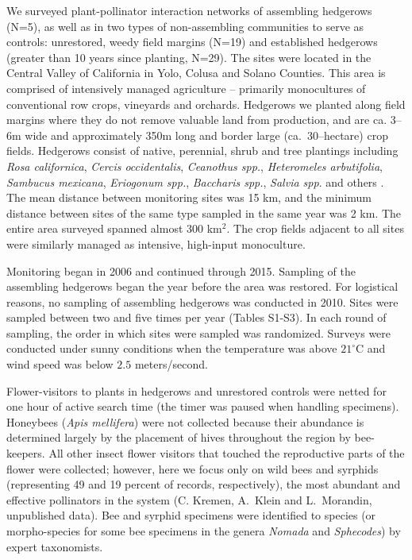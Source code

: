 \documentclass[12pt]{article}
\begin{document}
We surveyed plant-pollinator interaction networks of assembling
hedgerows (N=5), as well as in two types of non-assembling communities
to serve as controls: unrestored, weedy field margins (N=19) and
established hedgerows (greater than 10 years since planting,
N=29). The sites were located in the Central Valley of California in
Yolo, Colusa and Solano Counties. This area is comprised of
intensively managed agriculture -- primarily monocultures of
conventional row crops, vineyards and orchards. Hedgerows we planted
along field margins where they do not remove valuable land from
production, and are ca. 3--6m wide and approximately 350m long and
border large (ca.\ 30--hectare) crop fields. Hedgerows consist of
native, perennial, shrub and tree plantings including \textit{Rosa
  californica}, \textit{Cercis occidentalis}, \textit{Ceanothus spp.},
\textit{Heteromeles arbutifolia}, \textit{Sambucus mexicana},
\textit{Eriogonum spp.}, \textit{Baccharis spp.}, \textit{Salvia
  spp}. and others \citep{kremen-2015-602, mgonigle-2015-x}. The mean
distance between monitoring sites was 15 km, and the minimum distance
between sites of the same type sampled in the same year was 2 km.  The
entire area surveyed spanned almost 300 km$^2$. The crop fields
adjacent to all sites were similarly managed as intensive, high-input
monoculture.

Monitoring began in 2006 and continued through 2015. Sampling of the
assembling hedgerows began the year before the area was restored. For
logistical reasons, no sampling of assembling hedgerows was conducted
in 2010. Sites were sampled between two and five times per year
(Tables S1-S3). In each round of
sampling, the order in which sites were sampled was
randomized. Surveys were conducted under sunny conditions when the
temperature was above $21^{\circ}\mathrm{C}$ and wind speed was below
$2.5$ meters/second.

Flower-visitors to plants in hedgerows and unrestored controls were
netted for one hour of active search time (the timer was paused when
handling specimens). Honeybees (\textit{Apis mellifera}) were not
collected because their abundance is determined largely by the
placement of hives throughout the region by bee-keepers. All other
insect flower visitors that touched the reproductive parts of the
flower were collected; however, here we focus only on wild bees and
syrphids (representing 49 and 19 percent of records, respectively),
the most abundant and effective pollinators in the system (C. Kremen,
A.~Klein and L.~Morandin, unpublished data). Bee and syrphid specimens
were identified to species (or morpho-species for some bee specimens
in the genera \textit{Nomada} and \textit{Sphecodes}) by expert
taxonomists.
\end{document}
